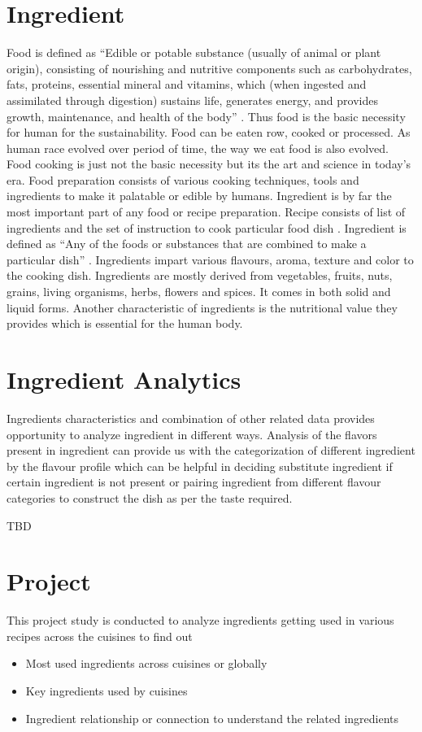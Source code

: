 \documentclass[sigconf]{acmart}
\begin{document}
\section{Ingredient}
Food is defined as ``Edible or potable substance (usually of animal or plant origin), consisting of nourishing and nutritive components such as carbohydrates, fats, proteins, essential mineral and vitamins, which (when ingested and assimilated through digestion) sustains life, generates energy, and provides growth, maintenance, and health of the body'' \cite{www-businessdictionary}. Thus food is the basic necessity for human for the sustainability. Food can be eaten row, cooked or processed. As human race evolved over period of time, the way we eat food is also evolved. Food cooking is just not the basic necessity but its the art and science in today's era. Food preparation consists of various cooking techniques, tools and ingredients to make it palatable or edible by humans. Ingredient is by far the most important part of any food or recipe preparation. Recipe consists of list of ingredients and the set of instruction to cook particular food dish \cite{www-collinsdictionary}. Ingredient is defined as ``Any of the foods or substances that are combined to make a particular dish'' \cite{www-oxforddictionaries}. Ingredients impart various flavours, aroma, texture and color to the cooking dish. Ingredients are mostly derived from vegetables, fruits, nuts, grains, living organisms, herbs, flowers and spices. It comes in both solid and liquid forms. Another characteristic of ingredients is the nutritional value they provides which is essential for the human body.

\section{Ingredient Analytics}
Ingredients characteristics and combination of other related data provides opportunity to analyze ingredient in different ways. Analysis of the flavors present in ingredient can provide us with the categorization of different ingredient by the flavour profile which can be helpful in deciding substitute ingredient if certain ingredient is not present or pairing ingredient from different flavour categories to construct the dish as per the taste required. 

TBD

\section{Project}
This project study is conducted to analyze ingredients getting used in various recipes across the cuisines to find out
\begin{itemize}
\item Most used ingredients across cuisines or globally
\item Key ingredients used by cuisines
\item Ingredient relationship or connection to understand the related ingredients
\end{itemize}
\end{document}
